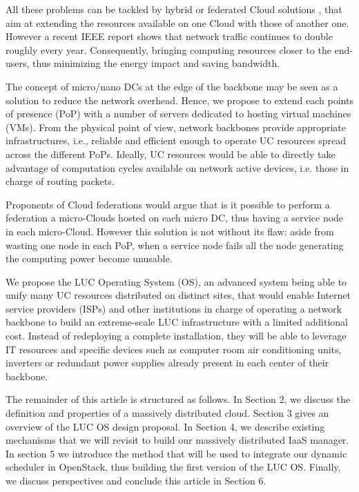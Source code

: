 All these problems can be tackled by hybrid or federated Cloud solutions 
\cite{armbrust:2010}, that aim at extending the resources available on one Cloud
with those of another one. However a recent IEEE report 
\cite{ieeenetreport:2012} shows that network traffic continues to double 
roughly every year. Consequently, bringing computing resources closer to the 
end-users, thus minimizing the energy impact and saving bandwidth.

The concept of micro/nano DCs at the edge of the backbone \cite{greenberg:2008} 
may be seen as a solution to reduce the network overhead. Hence, we propose to 
extend each points of presence (PoP) with a number of servers dedicated to 
hosting virtual machines (VMs). From the physical point of view, network 
backbones provide appropriate infrastructures, i.e., reliable and efficient 
enough to operate UC resources spread across the different PoPs. Ideally, UC 
resources would be able to directly take advantage of computation cycles 
available on network active devices, i.e. those in charge of routing packets.

Proponents of Cloud federations would argue that is it possible to perform
a federation a micro-Clouds hosted on each micro DC, thus having a service node
in each micro-Cloud. However this solution is not without its flaw: aside from
wasting one node in each PoP, when a service node fails all the node generating
the computing power become unusable.

We propose the LUC Operating System (OS), an advanced system being able to unify
many UC resources distributed on distinct sites, that would enable Internet service 
providers (ISPs) and other institutions in charge of operating a network 
backbone to build an extreme-scale LUC infrastructure with a limited additional 
cost. Instead of redeploying a complete installation, they will be able to 
leverage IT resources and specific devices such as computer room air 
conditioning units, inverters or redundant power supplies already present in 
each center of their backbone.

The remainder of this article is structured as follows. In Section 2, we discuss
the definition and properties of a massively distributed cloud. 
Section 3 gives an overview of the LUC OS design 
proposal. In Section 4, we describe existing mechanisms that we will 
revisit to build our massively distributed IaaS manager. In section 5 we 
introduce the method that will be used to integrate our dynamic scheduler in 
OpenStack, thus building the first version of the LUC OS. Finally, we discuss 
perspectives and conclude this article in Section 6.
